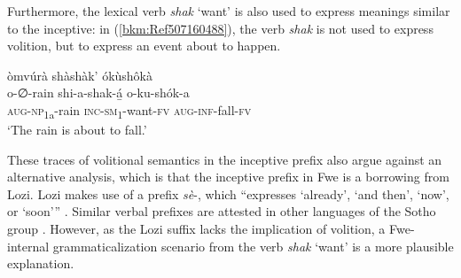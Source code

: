 Furthermore, the lexical verb \textit{shak} ‘want’ is also used to express meanings similar to the inceptive: in (\ref{bkm:Ref507160488}), the verb \textit{shak} is not used to express volition, but to express an event about to happen.

\ea
\label{bkm:Ref507160488}
òmvúrà shàshàk’ ókùshôkà\\
\gll o-∅-rain    shi-a-shak-á̲    o-ku-shók-a\\
\textsc{aug}-\textsc{np}\textsubscript{1a}-rain  \textsc{inc}-\textsc{sm}\textsubscript{1}-want-\textsc{fv}  \textsc{aug}-\textsc{inf}-fall-\textsc{fv}\\
\glt ‘The rain is about to fall.’
\z

These traces of volitional semantics in the inceptive prefix also argue against an alternative analysis, which is that the inceptive prefix in Fwe is a borrowing from Lozi. Lozi makes use of a prefix \textit{sè}-, which “expresses ‘already’, ‘and then’, ‘now’, or ‘soon’” \citep[199]{Gowlett1967}. Similar verbal prefixes are attested in other languages of the Sotho group \citep[143]{Doke1954}. However, as the Lozi suffix lacks the implication of volition, a Fwe-internal grammaticalization scenario from the verb \textit{shak} ‘want’ is a more plausible explanation.

